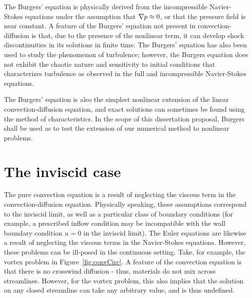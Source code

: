 The Burgers' equation is physically derived from the incompressible Navier-Stokes equations under the assumption that $\grad p \approx 0$, or that the pressure field is near constant. A feature of the Burgers' equation not present in convection-diffusion is that, due to the presence of the nonlinear term, it can develop shock discontinuities in its solutions in finite time.  The Burgers' equation has also been used to study the phenomenon of turbulence; however, the Burgers equation does not exhibit the chaotic nature and sensitivity to initial conditions that characterizes turbulence as observed in the full and incompressible Navier-Stokes equations. 

The Burgers' equation is also the simplest nonlinear extension of the linear convection-diffusion equation, and exact solutions can sometimes be found using the method of characteristics. In the scope of this dissertation proposal, Burgers shall be used as to test the extension of our numerical method to nonlinear problems. 

\section{The inviscid case}

The pure convection equation is a result of neglecting the viscous term in the convection-diffusion equation. Physically speaking, these assumptions correspond to the inviscid limit, as well as a particular class of boundary conditions (for example, a prescribed inflow condition may be incompatible with the wall boundary condition $u = 0$ in the inviscid limit).  The Euler equations are likewise a result of neglecting the viscous terms in the Navier-Stokes equations.  However, these problems can be ill-posed in the continuous setting.  Take, for example, the vortex problem in Figure~\ref{fig:convCirc}.  A feature of the convection equation is that there is no crosswind diffusion - thus, materials do not mix across streamlines.  However, for the vortex problem, this also implies that the solution on any closed streamline can take any arbitrary value, and is thus undefined. 

